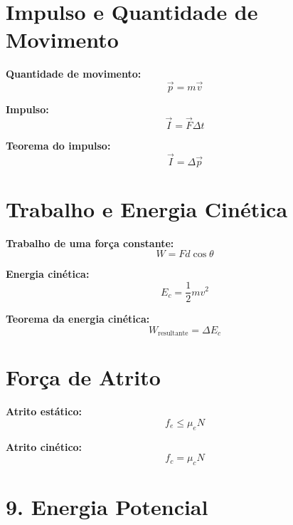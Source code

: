 \documentclass[a4paper,12pt]{article}
\begin{document}
\begin{multicols}{2}
\section{Impulso e Quantidade de Movimento}

\textbf{Quantidade de movimento:}
\begin{equation*}
  \vec{p} = m \vec{v}
\end{equation*}

\textbf{Impulso:}
\begin{equation*}
  \vec{I} = \vec{F} \Delta t
\end{equation*}

\textbf{Teorema do impulso:}
\begin{equation*}
  \vec{I} = \Delta \vec{p}
\end{equation*}

\section{Trabalho e Energia Cinética}

\textbf{Trabalho de uma força constante:}
\begin{equation*}
  W = F d \cos \theta
\end{equation*}

\textbf{Energia cinética:}
\begin{equation*}
  E_c = \frac{1}{2} m v^2
\end{equation*}

\textbf{Teorema da energia cinética:}
\begin{equation*}
  W_{\text{resultante}} = \Delta E_c
\end{equation*}

\section{Força de Atrito}

\textbf{Atrito estático:}
\begin{equation*}
  f_e \leq \mu_e N
\end{equation*}

\textbf{Atrito cinético:}
\begin{equation*}
  f_c = \mu_c N
\end{equation*}

\section{9. Energia Potencial}


\end{multicols}
\end{document}
